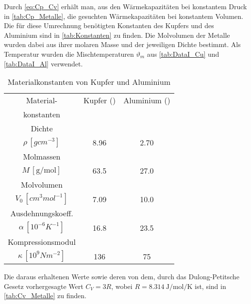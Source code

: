 	Durch \eqref{eq:Cp_Cv} erhält man, aus den Wärmekapazitäten bei konstantem Druck in \autoref{tab:Cp_Metalle}, die gesuchten 
	Wärmekapazitäten bei konstantem Volumen. Die für diese Umrechnung benötigten Konstanten des Kupfers und des Aluminium sind 
	in \autoref{tab:Konstanten} zu finden. Die Molvolumen der Metalle wurden dabei aus ihrer molaren Masse und der jeweiligen Dichte
	bestimmt. Als Temperatur wurden die Mischtemperaturen $\vartheta_{m}$ aus \autoref{tab:DataI_Cu} und \ref{tab:DataI_Al} verwendet.
	\begin{table}[!h]
		\centering
		\begin{tabular}{|c||c|c|}
			\hline
			           Material-            & Kupfer (\ce{Cu}) & Aluminium (\ce{Al}) \\
			          konstanten            &                  &  \\ \hline\hline
			            Dichte              &                  &  \\
			    $\rho\,[\si{gcm^{-3}}]$     &    \num{8.96}    &     \num{2.70}      \\ \hline
			           Molmassen            &                  &  \\
			    $M\,[\si{\g\per\mol}]$      &    \num{63.5}    &     \num{27.0}      \\ \hline
			          Molvolumen            &                  &  \\
			$V_{0}\,[\si{cm^{3}mol^{-1}}]$  &    \num{7.09}    &     \num{10.0}      \\ \hline
			Ausdehnungskoeff.\footnotemark  &                  &  \\
			$\alpha\,[\si{10^{-6}K^{-1}}]$  &    \num{16.8}    &     \num{23.5}      \\ \hline
			       Kompressionsmodul        &                  &  \\
			$\kappa\,[\si{10^{9} Nm^{-2}}]$ &    \num{136}     &      \num{75}       \\ \hline
		\end{tabular}
		\caption{Materialkonstanten von Kupfer und Aluminium \label{tab:Konstanten}}
	\end{table}

	Die daraus erhaltenen Werte sowie deren  von dem, durch das Dulong-Petitsche Gesetz vorhergesagte Wert $C_{V} = 3R$,
	wobei $R = \SI{8.314}{\joule\per\mol\per\kelvin}$ \cite{SciPy} ist, sind in \autoref{tab:Cv_Metalle} zu finden.
	

